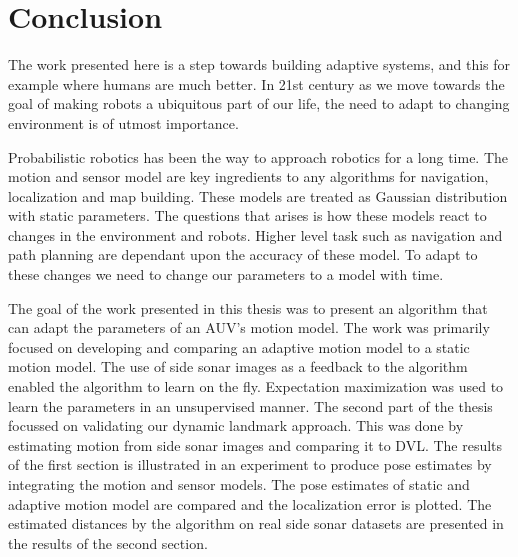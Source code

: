 \documentclass[12pt]{dalcsthesis}
\begin{document}
\chapter{Conclusion}
The work presented here is a step towards building adaptive systems, and this for example where humans are much better. In 21st century as we move towards the goal of making robots a ubiquitous part of our life, the need to adapt to changing environment is of utmost importance. 

Probabilistic robotics has been the way to approach robotics for a long time. The motion and sensor model are key ingredients to any algorithms for navigation, localization and map building. These models are treated as Gaussian distribution with static parameters. The questions that arises is how these models react to changes in the environment and robots. Higher level task such as navigation and path planning are dependant upon the accuracy of these model. To adapt to these changes we need to change our parameters to a model with time.

The goal of the work presented in this thesis was to present an algorithm that can adapt the parameters of an AUV's motion model. The work was primarily focused on developing and comparing an adaptive motion model to a static motion model. The use of side sonar images as a feedback to the algorithm enabled the algorithm to learn on the fly. Expectation maximization was used to learn the parameters in an unsupervised manner. The second part of the thesis focussed on validating our dynamic landmark approach. This was done by estimating motion from side sonar images and comparing it to DVL. The results of the first section is illustrated in an experiment to produce pose estimates by integrating the motion and sensor models. The pose estimates of static and adaptive motion model are compared and the localization error is plotted. The estimated distances by the algorithm on real side sonar datasets are presented in the results of the second section.
\end{document}
